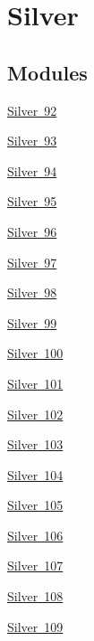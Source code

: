 \hypertarget{group___isotope_const-_silver}{}\section{Silver}
\label{group___isotope_const-_silver}
\subsection*{Modules}
\begin{DoxyCompactItemize}
\item 
\mbox{\hyperlink{group___isotope_const-_silver-_ag92}{Silver 92}}
\item 
\mbox{\hyperlink{group___isotope_const-_silver-_ag93}{Silver 93}}
\item 
\mbox{\hyperlink{group___isotope_const-_silver-_ag94}{Silver 94}}
\item 
\mbox{\hyperlink{group___isotope_const-_silver-_ag95}{Silver 95}}
\item 
\mbox{\hyperlink{group___isotope_const-_silver-_ag96}{Silver 96}}
\item 
\mbox{\hyperlink{group___isotope_const-_silver-_ag97}{Silver 97}}
\item 
\mbox{\hyperlink{group___isotope_const-_silver-_ag98}{Silver 98}}
\item 
\mbox{\hyperlink{group___isotope_const-_silver-_ag99}{Silver 99}}
\item 
\mbox{\hyperlink{group___isotope_const-_silver-_ag100}{Silver 100}}
\item 
\mbox{\hyperlink{group___isotope_const-_silver-_ag101}{Silver 101}}
\item 
\mbox{\hyperlink{group___isotope_const-_silver-_ag102}{Silver 102}}
\item 
\mbox{\hyperlink{group___isotope_const-_silver-_ag103}{Silver 103}}
\item 
\mbox{\hyperlink{group___isotope_const-_silver-_ag104}{Silver 104}}
\item 
\mbox{\hyperlink{group___isotope_const-_silver-_ag105}{Silver 105}}
\item 
\mbox{\hyperlink{group___isotope_const-_silver-_ag106}{Silver 106}}
\item 
\mbox{\hyperlink{group___isotope_const-_silver-_ag107}{Silver 107}}
\item 
\mbox{\hyperlink{group___isotope_const-_silver-_ag108}{Silver 108}}
\item 
\mbox{\hyperlink{group___isotope_const-_silver-_ag109}{Silver 109}}
\item 

\end{DoxyCompactItemize}
